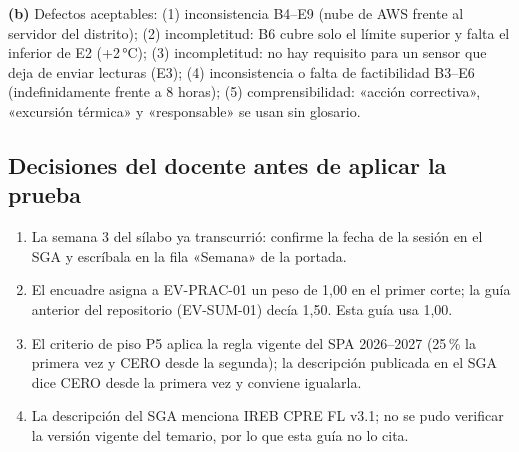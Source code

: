 \documentclass[11pt]{article}
\newcommand{\subseccion}[1]{\subsection{\textcolor{midblue}{#1}}}
\begin{document}
\textbf{(b)} Defectos aceptables: (1) inconsistencia B4--E9 (nube de AWS frente al servidor del distrito); (2) incompletitud: B6 cubre solo el límite superior y falta el inferior de E2 (+2\,°C); (3) incompletitud: no hay requisito para un sensor que deja de enviar lecturas (E3); (4) inconsistencia o falta de factibilidad B3--E6 (indefinidamente frente a 8 horas); (5) comprensibilidad: «acción correctiva», «excursión térmica» y «responsable» se usan sin glosario.



\subseccion{Decisiones del docente antes de aplicar la prueba}



\begin{enumerate}[leftmargin=18pt,itemsep=2pt]

	\item La semana 3 del sílabo ya transcurrió: confirme la fecha de la sesión en el SGA y escríbala en la fila «Semana» de la portada.

	\item El encuadre asigna a EV-PRAC-01 un peso de 1,00 en el primer corte; la guía anterior del repositorio (EV-SUM-01) decía 1,50. Esta guía usa 1,00.

	\item El criterio de piso P5 aplica la regla vigente del SPA 2026--2027 (25\,\% la primera vez y CERO desde la segunda); la descripción publicada en el SGA dice CERO desde la primera vez y conviene igualarla.

	\item La descripción del SGA menciona IREB CPRE FL v3.1; no se pudo verificar la versión vigente del temario, por lo que esta guía no lo cita.

\end{enumerate}




\fi











\end{document}
